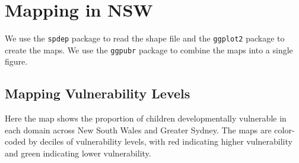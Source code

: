 \documentclass[
  letterpaper,
  DIV=11,
  numbers=noendperiod]{scrartcl}
\begin{document}
\section{Mapping in NSW}\label{mapping-in-nsw}

We use the \texttt{spdep} package to read the shape file and the
\texttt{ggplot2} package to create the maps. We use the \texttt{ggpubr}
package to combine the maps into a single figure.

\subsection{Mapping Vulnerability
Levels}\label{mapping-vulnerability-levels}

Here the map shows the proportion of children developmentally vulnerable
in each domain across New South Wales and Greater Sydney. The maps are
color-coded by deciles of vulnerability levels, with red indicating
higher vulnerability and green indicating lower vulnerability.
\end{document}
